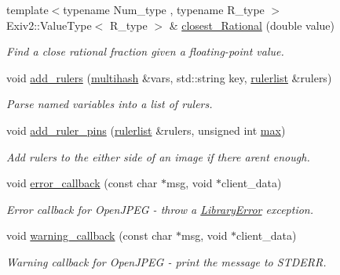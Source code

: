 \begin{DoxyCompactItemize}
{\footnotesize template$<$typename Num\+\_\+type , typename R\+\_\+type $>$ }\\Exiv2\+::\+Value\+Type$<$ R\+\_\+type $>$ \& \hyperlink{namespace_photo_finish_ae830bdcf87b4a84d55d039ed80a11151}{closest\+\_\+\+Rational} (double value)
\begin{DoxyCompactList}\small\item\em Find a close rational fraction given a floating-\/point value. \end{DoxyCompactList}\item 
void \hyperlink{namespace_photo_finish_ab4da74b24d961ccdc8a10f357d6554f1}{add\+\_\+rulers} (\hyperlink{namespace_photo_finish_a6f41796f162687538b7da5c7a95e2d18}{multihash} \&vars, std\+::string key, \hyperlink{namespace_photo_finish_a0abe5e95cf4de0f8f86aeabcf037082b}{rulerlist} \&rulers)
\begin{DoxyCompactList}\small\item\em Parse named variables into a list of rulers. \end{DoxyCompactList}\item 
void \hyperlink{namespace_photo_finish_aac9bbe14ef01bbb3692dfeba330c77b9}{add\+\_\+ruler\+\_\+pins} (\hyperlink{namespace_photo_finish_a0abe5e95cf4de0f8f86aeabcf037082b}{rulerlist} \&rulers, unsigned int \hyperlink{_crop_solution_8cc_affe776513b24d84b39af8ab0930fef7f}{max})
\begin{DoxyCompactList}\small\item\em Add rulers to the either side of an image if there aren\textquotesingle{}t enough. \end{DoxyCompactList}\item 
void \hyperlink{namespace_photo_finish_a8f2a0015f605e0f89ff8e2080e62abd6}{error\+\_\+callback} (const char $\ast$msg, void $\ast$client\+\_\+data)
\begin{DoxyCompactList}\small\item\em Error callback for Open\+J\+P\+EG -\/ throw a \hyperlink{class_photo_finish_1_1_library_error}{Library\+Error} exception. \end{DoxyCompactList}\item 
void \hyperlink{namespace_photo_finish_a5ade5f8f065cbecf79f0d76fed6c1e97}{warning\+\_\+callback} (const char $\ast$msg, void $\ast$client\+\_\+data)
\begin{DoxyCompactList}\small\item\em Warning callback for Open\+J\+P\+EG -\/ print the message to S\+T\+D\+E\+RR. \end{DoxyCompactList}\item 

\end{DoxyCompactItemize}
